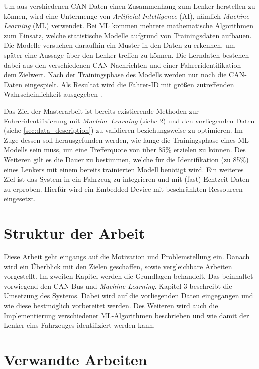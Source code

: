 Um aus vershiedenen CAN-Daten einen Zusammenhang zum Lenker herstellen zu können, wird eine Untermenge von \textit{Artificial Intelligence} (AI), nämlich \textit{Machine Learning} (ML) verwendet. Bei ML kommen mehrere mathematische Algorithmen zum Einsatz, welche statistische Modelle aufgrund von Trainingsdaten aufbauen. Die Modelle versuchen daraufhin ein Muster in den Daten zu erkennen, um später eine Aussage über den Lenker treffen zu können. Die Lerndaten bestehen dabei aus den verschiedenen CAN-Nachrichten und einer Fahreridentifikation - dem Zielwert. Nach der Trainingsphase des Modells werden nur noch die CAN-Daten eingespielt. Als Resultat wird die Fahrer-ID mit größen zutreffenden Wahrscheinlichkeit ausgegeben \cite{Conway2012}.

Das Ziel der Masterarbeit ist bereits existierende Methoden zur Fahreridentifizierung mit \textit{Machine Learning} (siehe \ref{sec:related_work}) und den vorliegenden Daten (siehe \ref{sec:data_description}) zu validieren beziehungsweise zu optimieren. Im Zuge dessen soll herausgefunden werden, wie lange die Trainingsphase eines ML-Modells sein muss, um eine Trefferquote von über 85\% erzielen zu können. Des Weiteren gilt es die Dauer zu bestimmen, welche für die Identifikation (zu 85\%) eines Lenkers mit einem bereits trainierten Modell benötigt wird. Ein weiteres Ziel ist das System in ein Fahrzeug zu integrieren und mit (fast) Echtzeit-Daten zu erproben. Hierfür wird ein Embedded-Device mit beschränkten Ressourcen eingesetzt.

\section{Struktur der Arbeit}
\label{sec:structure}


Diese Arbeit geht eingangs auf die Motivation und Problemstellung ein. Danach wird ein Überblick mit den Zielen geschaffen, sowie vergleichbare Arbeiten vorgestellt. Im zweiten Kapitel werden die Grundlagen behandelt. Das beinhaltet vorwiegend den CAN-Bus und \textit{Machine Learning}. Kapitel 3 beschreibt die Umsetzung des Systems. Dabei wird auf die vorliegenden Daten eingegangen und wie diese bestmöglich vorbereitet werden. Des Weiteren wird auch die Implementierung verschiedener ML-Algorithmen beschrieben und wie damit der Lenker eins Fahrzeuges identifiziert werden kann.

\section{Verwandte Arbeiten}
\label{sec:related_work}

